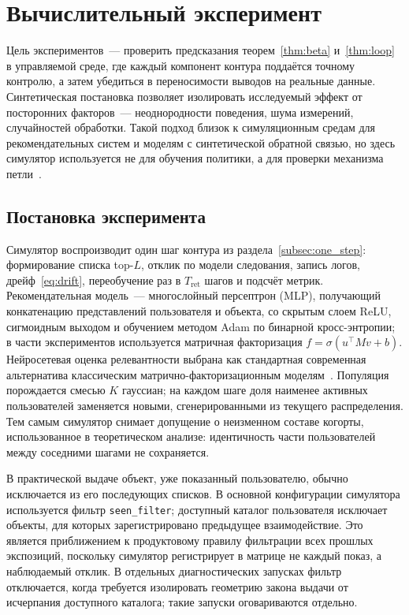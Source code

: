 \section{Вычислительный эксперимент}
\label{sec:Chapter4} 

Цель экспериментов~--- проверить предсказания теорем~\ref{thm:beta}
и~\ref{thm:loop} в управляемой среде, где каждый компонент контура поддаётся
точному контролю, а затем убедиться в переносимости выводов на реальные данные.
Синтетическая постановка позволяет изолировать исследуемый эффект от посторонних
факторов~--- неоднородности поведения, шума измерений, случайностей обработки.
Такой подход близок к симуляционным средам для рекомендательных систем и
моделям с синтетической обратной связью, но здесь симулятор используется не для обучения
политики, а для проверки механизма петли~\cite{ie2019,
wang2021generativeFeedback, afsar2022rlSurvey}.

\subsection{Постановка эксперимента}
\label{subsec:exp_setup}

Симулятор воспроизводит один шаг контура из раздела~\ref{subsec:one_step}:
формирование списка top-$L$, отклик по модели следования, запись логов,
дрейф~\eqref{eq:drift}, переобучение раз в $T_{\mathrm{ret}}$ шагов и подсчёт
метрик. Рекомендательная модель~--- многослойный персептрон (MLP), получающий
конкатенацию представлений пользователя и объекта, со скрытым слоем ReLU,
сигмоидным выходом и обучением методом Adam по бинарной кросс-энтропии; в части экспериментов
используется матричная факторизация $f=\sigma(u^\top M v+b)$. Нейросетевая
оценка релевантности выбрана как стандартная современная альтернатива классическим
матрично-факторизационным моделям~\cite{he2017}. Популяция
порождается смесью $K$ гауссиан; на каждом шаге доля наименее активных
пользователей заменяется новыми, сгенерированными из текущего распределения.
Тем самым симулятор снимает допущение о неизменном составе когорты,
использованное в теоретическом анализе: идентичность части пользователей между
соседними шагами не сохраняется.

В практической выдаче объект, уже показанный пользователю, обычно исключается из
его последующих списков. В основной конфигурации симулятора используется фильтр
\texttt{seen\_filter}; доступный каталог пользователя исключает объекты, для
которых зарегистрировано предыдущее взаимодействие. Это является приближением к
продуктовому правилу фильтрации всех прошлых экспозиций, поскольку симулятор
регистрирует в матрице не каждый показ, а наблюдаемый отклик. В отдельных
диагностических запусках фильтр отключается, когда требуется изолировать
геометрию закона выдачи от исчерпания доступного каталога; такие запуски
оговариваются отдельно.

